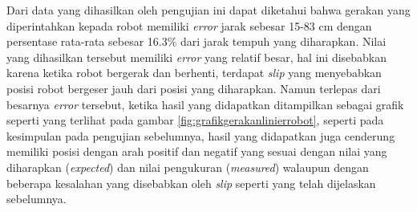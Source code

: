

Dari data yang dihasilkan oleh pengujian ini dapat diketahui bahwa gerakan yang diperintahkan kepada robot memiliki \emph{error} jarak sebesar 15-83 cm dengan persentase rata-rata sebesar 16.3\% dari jarak tempuh yang diharapkan.
Nilai yang dihasilkan tersebut memiliki \emph{error} yang relatif besar,
  hal ini disebabkan karena ketika robot bergerak dan berhenti, terdapat \emph{slip} yang menyebabkan posisi robot bergeser jauh dari posisi yang diharapkan.
Namun terlepas dari besarnya \emph{error} tersebut,
  ketika hasil yang didapatkan ditampilkan sebagai grafik seperti yang terlihat pada gambar \ref{fig:grafikgerakanlinierrobot},
  seperti pada kesimpulan pada pengujian sebelumnya,
  hasil yang didapatkan juga cenderung memiliki posisi dengan arah positif dan negatif yang sesuai dengan nilai yang diharapkan (\emph{expected}) dan nilai pengukuran (\emph{measured}) walaupun dengan beberapa kesalahan yang disebabkan oleh \emph{slip} seperti yang telah dijelaskan sebelumnya.


